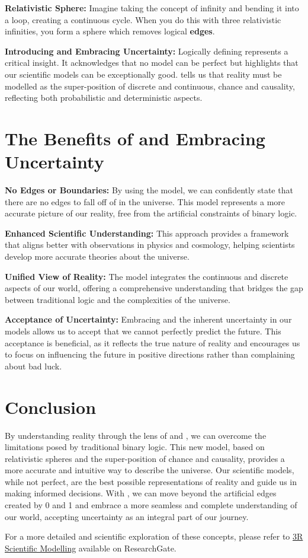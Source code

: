 \documentclass{article}
\begin{document}
\textbf{Relativistic Sphere:}
Imagine taking the concept of infinity and bending it into a loop, creating a continuous cycle. When you do this with three relativistic infinities, you form a sphere which removes logical \textbf{edges}.

\textbf{Introducing \qbit{} and Embracing Uncertainty:}
Logically defining \qbit{} represents a critical \iR{} insight. It acknowledges that no model can be perfect but highlights that our scientific models can be exceptionally good. \qbit{} tells us that reality must be modelled as the super-position of discrete and continuous, chance and causality, reflecting both probabilistic and deterministic aspects.

\section*{The Benefits of \iR{} and Embracing \qbit{} Uncertainty}

\hspace*{\parindent}\textbf{No Edges or Boundaries:} By using the \iR{} model, we can confidently state that there are no edges to fall off of in the universe. This model represents a more accurate picture of our reality, free from the artificial constraints of binary logic.

\textbf{Enhanced Scientific Understanding:} This approach provides a framework that aligns better with observations in physics and cosmology, helping scientists develop more accurate theories about the universe.

\textbf{Unified View of Reality:} The \iR{} model integrates the continuous and discrete aspects of our world, offering a comprehensive understanding that bridges the gap between traditional logic and the complexities of the universe.

\textbf{Acceptance of Uncertainty:} Embracing \qbit{} and the inherent uncertainty in our models allows us to accept that we cannot perfectly predict the future. This acceptance is beneficial, as it reflects the true nature of reality and encourages us to focus on influencing the future in positive directions rather than complaining about bad luck.

\section*{Conclusion}

By understanding reality through the lens of \iR{} and \qbit{}, we can overcome the limitations posed by traditional binary logic. This new model, based on relativistic spheres and the super-position of chance and causality, provides a more accurate and intuitive way to describe the universe. Our scientific models, while not perfect, are the best possible representations of reality and guide us in making informed decisions. With \iR{}, we can move beyond the artificial edges created by 0 and 1 and embrace a more seamless and complete understanding of our world, accepting uncertainty as an integral part of our journey.

For a more detailed and scientific exploration of these concepts, please refer to \href{https://www.researchgate.net/publication/379035220_3R_Scientific_Modelling}{3R Scientific Modelling} available on ResearchGate.
\end{document}
